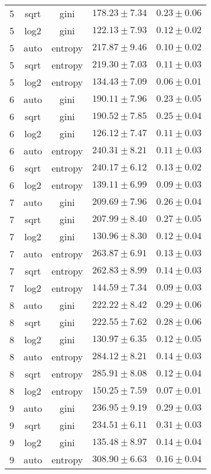 \begin{tabular}{cccrr}
5 & sqrt & gini & $178.23 \pm 7.34$ & $0.23 \pm 0.06$\\
5 & log2 & gini & $122.13 \pm 7.93$ & $0.12 \pm 0.02$\\
5 & auto & entropy & $217.87 \pm 9.46$ & $0.10 \pm 0.02$\\
5 & sqrt & entropy & $219.30 \pm 7.03$ & $0.11 \pm 0.03$\\
5 & log2 & entropy & $134.43 \pm 7.09$ & $0.06 \pm 0.01$\\
6 & auto & gini & $190.11 \pm 7.96$ & $0.23 \pm 0.05$\\
6 & sqrt & gini & $190.52 \pm 7.85$ & $0.25 \pm 0.04$\\
6 & log2 & gini & $126.12 \pm 7.47$ & $0.11 \pm 0.03$\\
6 & auto & entropy & $240.31 \pm 8.21$ & $0.11 \pm 0.03$\\
6 & sqrt & entropy & $240.17 \pm 6.12$ & $0.13 \pm 0.02$\\
6 & log2 & entropy & $139.11 \pm 6.99$ & $0.09 \pm 0.03$\\
7 & auto & gini & $209.69 \pm 7.96$ & $0.26 \pm 0.04$\\
7 & sqrt & gini & $207.99 \pm 8.40$ & $0.27 \pm 0.05$\\
7 & log2 & gini & $130.96 \pm 8.30$ & $0.12 \pm 0.04$\\
7 & auto & entropy & $263.87 \pm 6.91$ & $0.13 \pm 0.03$\\
7 & sqrt & entropy & $262.83 \pm 8.99$ & $0.14 \pm 0.03$\\
7 & log2 & entropy & $144.59 \pm 7.34$ & $0.09 \pm 0.03$\\
8 & auto & gini & $222.22 \pm 8.42$ & $0.29 \pm 0.06$\\
8 & sqrt & gini & $222.55 \pm 7.62$ & $0.28 \pm 0.06$\\
8 & log2 & gini & $130.97 \pm 6.35$ & $0.12 \pm 0.05$\\
8 & auto & entropy & $284.12 \pm 8.21$ & $0.14 \pm 0.03$\\
8 & sqrt & entropy & $285.91 \pm 8.08$ & $0.12 \pm 0.04$\\
8 & log2 & entropy & $150.25 \pm 7.59$ & $0.07 \pm 0.01$\\
9 & auto & gini & $236.95 \pm 9.19$ & $0.29 \pm 0.03$\\
9 & sqrt & gini & $234.51 \pm 6.11$ & $0.31 \pm 0.03$\\
9 & log2 & gini & $135.48 \pm 8.97$ & $0.14 \pm 0.04$\\
9 & auto & entropy & $308.90 \pm 6.63$ & $0.16 \pm 0.04$\\

\end{tabular}
